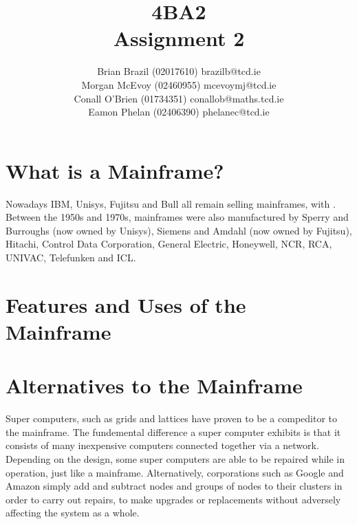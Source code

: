 \documentclass[a4paper,12pt]{article}
\begin{document}


\title{4BA2 \\ Assignment 2}

\author{Brian Brazil (02017610) brazilb@tcd.ie \\  Morgan McEvoy
(02460955) mcevoymj@tcd.ie \\ Conall O'Brien (01734351)
conallob@maths.tcd.ie \\ Eamon Phelan (02406390) phelanec@tcd.ie}

\maketitle

\section{What is a Mainframe?}

\cite[Mainframes (often colloquially referred to as big iron) are large and 
"expensive" computers used mainly by government institutions and 
large companies for mission critical applications, typically bulk data 
processing such as censuses, industry/consumer statistics, ERP, and 
financial transaction processing]{m1}


Nowadays IBM, Unisys, Fujitsu and Bull all remain selling mainframes,
with \cite[IBM mainframes dominating the market at over 90\%]{m1}.
Between the 1950s and 1970s, mainframes were also manufactured by 
Sperry and Burroughs (now owned by Unisys), Siemens and Amdahl (now 
owned by Fujitsu), Hitachi, Control Data Corporation, General Electric, 
Honeywell, NCR, RCA, UNIVAC, Telefunken and ICL. \cite [ IBM's 
dominance grew out of their development of the 360 series mainframes; 
this basic architecture has continued to evolve into their current 
zSeries/z9 mainframe, which is arguably the only mainframe architecture 
still extant that dates from this early period.]{m1}

\section{Features and Uses of the Mainframe}

\section{Alternatives to the Mainframe}

Super computers, such as grids and lattices have proven to be a
compeditor to the mainframe. The fundemental difference a super computer
exhibits is that it consists of many inexpensive computers connected
together via a network. Depending on the design, some super computers 
are able to be repaired while in operation, just like a mainframe. 
Alternatively, corporations such as Google and Amazon simply add and 
subtract nodes and groups of nodes to their clusters in order to 
carry out repairs, to make upgrades or replacements without adversely 
affecting the system as a whole.
\end{document}
